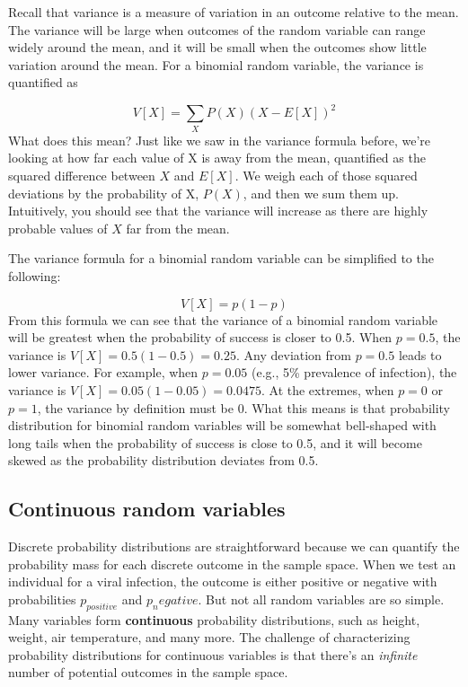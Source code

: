 \documentclass[
]{book}
\begin{document}
Recall that variance is a measure of variation in an outcome relative to the mean. The variance will be large when outcomes of the random variable can range widely around the mean, and it will be small when the outcomes show little variation around the mean. For a binomial random variable, the variance is quantified as

\[
V[X]=\sum_{X}P(X)(X-E[X])^2
\]
What does this mean? Just like we saw in the variance formula before, we're looking at how far each value of X is away from the mean, quantified as the squared difference between \(X\) and \(E[X]\). We weigh each of those squared deviations by the probability of X, \(P(X)\), and then we sum them up. Intuitively, you should see that the variance will increase as there are highly probable values of \(X\) far from the mean.

The variance formula for a binomial random variable can be simplified to the following:

\[
V[X]=p(1-p)
\]
From this formula we can see that the variance of a binomial random variable will be greatest when the probability of success is closer to 0.5. When \(p=0.5\), the variance is \(V[X]=0.5(1-0.5)=0.25\). Any deviation from \(p = 0.5\) leads to lower variance. For example, when \(p=0.05\) (e.g., 5\% prevalence of infection), the variance is \(V[X]=0.05(1-0.05)=0.0475\). At the extremes, when \(p = 0\) or \(p = 1\), the variance by definition must be 0. What this means is that probability distribution for binomial random variables will be somewhat bell-shaped with long tails when the probability of success is close to 0.5, and it will become skewed as the probability distribution deviates from 0.5.

\subsection{Continuous random variables}\label{continuous-random-variables}

Discrete probability distributions are straightforward because we can quantify the probability mass for each discrete outcome in the sample space. When we test an individual for a viral infection, the outcome is either positive or negative with probabilities \(p_{positive}\) and \(p_negative\). But not all random variables are so simple. Many variables form \textbf{continuous} probability distributions, such as height, weight, air temperature, and many more. The challenge of characterizing probability distributions for continuous variables is that there's an \emph{infinite} number of potential outcomes in the sample space.
\end{document}
